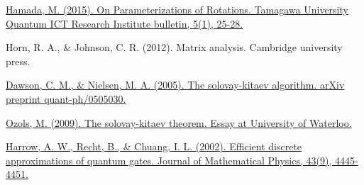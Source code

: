 \documentclass[11pt]{article}
\begin{document}
\begin{thebibliography}{9}
  
\href{https://www.tamagawa.jp/research/quantum/bulletin/pdf/Tamagawa.Vol.5-5.pdf}{Hamada, M. (2015). On Parameterizations of Rotations. Tamagawa University Quantum ICT Research Institute bulletin, 5(1), 25-28.}
 

Horn, R. A., \& Johnson, C. R. (2012). Matrix analysis. Cambridge university press.


\href{https://arxiv.org/pdf/quant-ph/0505030.pdf}{Dawson, C. M., \& Nielsen, M. A. (2005). The solovay-kitaev algorithm. arXiv preprint quant-ph/0505030.}

\href{http://home.lu.lv/~sd20008/papers/essays/Solovay-Kitaev.pdf}{Ozols, M. (2009). The solovay-kitaev theorem. Essay at University of Waterloo.}

\href{https://arxiv.org/pdf/quant-ph/0111031.pdf}{Harrow, A. W., Recht, B., & Chuang, I. L. (2002). Efficient discrete approximations of quantum gates. Journal of Mathematical Physics, 43(9), 4445-4451.}

\end{thebibliography}
\end{document}
